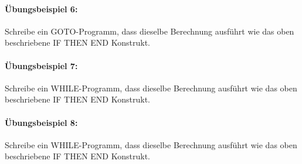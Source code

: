 \documentclass[11pt,a4paper,leqno]{report}
\numberwithin{equation}{chapter}
\begin{document}
\paragraph{\"Ubungsbeispiel 6:} Schreibe ein GOTO-Programm, dass dieselbe Berechnung ausf\"uhrt wie das oben beschriebene IF THEN END Konstrukt.

\paragraph{\"Ubungsbeispiel 7:} Schreibe ein WHILE-Programm, dass dieselbe Berechnung ausf\"uhrt wie das oben beschriebene IF THEN END Konstrukt.

\paragraph{\"Ubungsbeispiel 8:} Schreibe ein WHILE-Programm, dass dieselbe Berechnung ausf\"uhrt wie das oben beschriebene IF THEN END Konstrukt.
\end{document}
